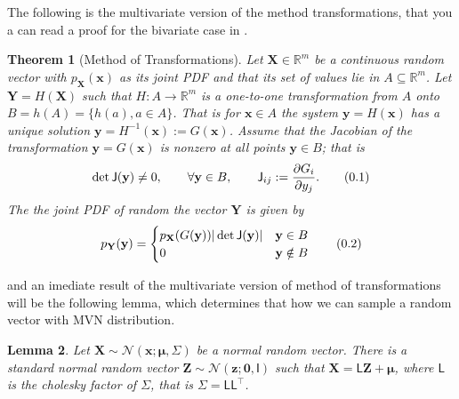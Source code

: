 \documentclass[10pt]{article}
\newtheorem{thm}{Theorem}[section]
\newtheorem{lem}[thm]{Lemma}
\theoremstyle{definition}
\theoremstyle{definition}
\theoremstyle{remark}
\newcommand\eqnum{\addtocounter{equation}{1}\tag{\arabic{section}.\arabic{equation}}}
\begin{document}
The following is the multivariate version of the method transformations, that you a can read a proof for the bivariate case in \cite{Gharamani2019}.
\begin{thm}[Method of Transformations]\label{thm:MT:MV}
Let $\mathbf{X}\in\mathbb{R}^m$ be a continuous random vector with  $p_\mathbf{X}(\mathbf{x})$ as its joint PDF and that its set of values lie in $A\subseteq\mathbb{R}^m$. Let $\mathbf{Y}=H(\mathbf{X})$ such that $H:A\to\mathbb{R}^m$ is a one-to-one transformation from $A$ onto $B=h(A)=\{h(a), a\in A\}$. That is for $\mathbf{x}\in A$ the system $\mathbf{y}=H(\mathbf{x})$ has a unique solution $\mathbf{y}=H^{-1}(\mathbf{x}):=G(\mathbf{x})$. Assume that the Jacobian of the transformation $\mathbf{y} = G(\mathbf{x})$ is nonzero at all points $\mathbf{y}\in B$; that is
\begin{equation*}
\det\mathsf{J}(\mathbf{y})\ne 0, \qquad \forall \mathbf{y}\in B, \qquad \mathsf{J}_{ij} := \frac{\partial G_i}{\partial y_j}.
\eqnum
\end{equation*}
The the joint PDF of random the vector $\mathbf{Y}$ is given by
\begin{equation*}
p_{\mathbf{Y}}(\mathbf{y}) = 
\begin{cases}
p_{\mathbf{X}}(G(\mathbf{y})) |\det\mathsf{J}(\mathbf{y})| & \mathbf{y} \in B \\
0 & \mathbf{y} \notin B
\end{cases}
\eqnum
\end{equation*}
\end{thm}
\noindent
and an imediate result of the multivariate version of method of transformations will be the following lemma, which determines that how we can sample a random vector with MVN distribution.
\begin{lem}
Let $\mathbf{X}\sim\mathcal{N}(\mathbf{x};\boldsymbol{\mu},\mathsf{\Sigma})$ be a normal random vector. There is a standard normal random vector $\mathbf{Z}\sim\mathcal{N}(\mathbf{z};\mathbf{0},\mathsf{I})$ such that $\mathbf{X}=\mathsf{L}\mathbf{Z}+\boldsymbol{\mu}$, where $\mathsf{L}$ is the cholesky factor of $\mathsf{\Sigma}$, that is $\mathsf{\Sigma} = \mathsf{L}\mathsf{L}^{\top}$.
\end{lem}
\end{document}
